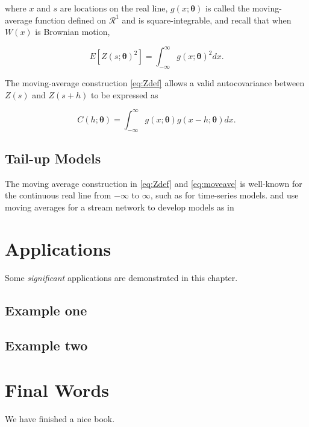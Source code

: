 \documentclass[]{book}
\theoremstyle{definition}
\theoremstyle{definition}
\theoremstyle{definition}
\theoremstyle{remark}
\begin{document}
where \(x\) and \(s\) are locations on the real line,
\(g(x;\boldsymbol{\theta})\) is called the moving-average function
defined on \(\mathcal{R}^{1}\) and is square-integrable, and recall that
when \(W(x)\) is Brownian motion,

\[
E[Z(s;\boldsymbol{\theta})^2]=\int_{-\infty}^{\infty}g(x;\boldsymbol{\theta})^2dx.
\]

The moving-average construction \eqref{eq:Zdef} allows a valid
autocovariance between \(Z(s)\) and \(Z(s+h)\) to be expressed as

\begin{equation} 
    C(h;\boldsymbol{\theta})= 
        \int_{-\infty}^{\infty}g(x;\boldsymbol{\theta})g(x-h;\boldsymbol{\theta})dx.
\label{eq:moveave}
\end{equation}

\hypertarget{tail-up-models}{%
\section{Tail-up Models}\label{tail-up-models}}

The moving average construction in \eqref{eq:Zdef} and \eqref{eq:moveave} is
well-known for the continuous real line from \(-\infty\) to \(\infty\),
such as for time-series models. \citet{Ver:Pete:Theo:spat:2006} and
\citet{Cres:Frey:Harc:Smit:spat:2006} use moving averages for a stream
network to develop models as in

\hypertarget{applications}{%
\chapter{Applications}\label{applications}}

Some \emph{significant} applications are demonstrated in this chapter.

\hypertarget{example-one}{%
\section{Example one}\label{example-one}}

\hypertarget{example-two}{%
\section{Example two}\label{example-two}}

\hypertarget{final-words}{%
\chapter{Final Words}\label{final-words}}

We have finished a nice book.


\end{document}
